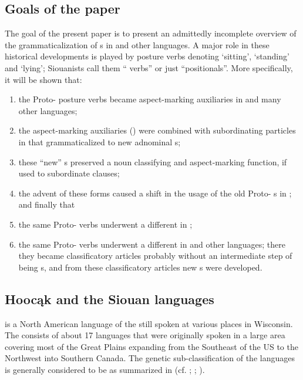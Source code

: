 \documentclass[output=paper]{langsci/langscibook}
\begin{document}
\subsection{Goals of the paper}\label{sec:helmbrecht:1.2}

The goal of the present paper is to present an admittedly incomplete overview of the grammaticalization of s in  and other  languages. A major role in these historical developments is played by posture verbs denoting `sitting', `standing' and `lying'; Siouanists call them `` verbs'' or just ``positionals''. More specifically, it will be shown that: 

\begin{enumerate}[label=\roman*.]
\item the Proto- posture verbs became aspect-marking auxiliaries in  and many other  languages;
\item the aspect-marking auxiliaries () were combined with subordinating  particles in  that grammaticalized to new adnominal s;
\item these ``new'' s preserved a noun classifying and aspect-mark\-ing function, if used to subordinate clauses;
\item the advent of these forms caused a shift in the usage of the old Proto- s in ; and finally that
\item the same Proto-  verbs underwent a different  in ;
\item the same Proto-  verbs underwent a different  in  and other  languages; there they became classificatory articles probably without an intermediate step of being s, and from these classificatory articles new s were developed.
\end{enumerate}

\subsection{Hoocąk and the Siouan languages}\label{sec:helmbrecht:1.3}

 is a North American  language of the   still spoken at various places in Wisconsin. The   consists of about 17 languages that were originally spoken in a large area covering most of the Great Plains expanding from the Southeast of the US to the Northwest into Southern Canada. The genetic sub-classification of the  languages is generally considered to be as summarized in  (cf. \citealt{Rood1979}; \citealt[501]{Mithun1999}; \citealt{ParksRankin2001}).
\end{document}

